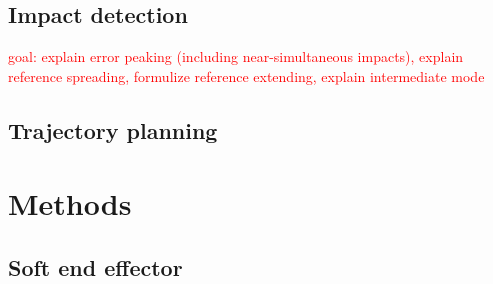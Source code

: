 \documentclass[a4paper, 10pt, conference]{ieeeconf}
\begin{document}
    \subsection{Impact detection}
    \textcolor{red}{goal: explain error peaking (including near-simultaneous impacts), explain reference spreading, formulize reference extending, explain intermediate mode}\\
    \subsection{Trajectory planning}

    \section{Methods}
    \subsection{Soft end effector}
\end{document}
